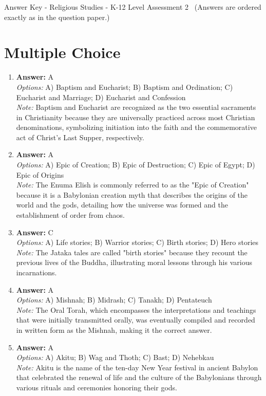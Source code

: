 \documentclass[12pt]{article}
\begin{document}
\begin{center}
Answer Key - Religious Studies - K-12 Level Assessment 2 \
\small (Answers are ordered exactly as in the question paper.)
\end{center}

\section*{Multiple Choice}
\begin{enumerate}[label=\arabic*.]
\item \textbf{Answer:} A
\\ \textit{Options:} A) Baptism and Eucharist; B) Baptism and Ordination; C) Eucharist and Marriage; D) Eucharist and Confession
\\ \textit{Note:} Baptism and Eucharist are recognized as the two essential sacraments in Christianity because they are universally practiced across most Christian denominations, symbolizing initiation into the faith and the commemorative act of Christ's Last Supper, respectively.
\item \textbf{Answer:} A
\\ \textit{Options:} A) Epic of Creation; B) Epic of Destruction; C) Epic of Egypt; D) Epic of Origins
\\ \textit{Note:} The Enuma Elish is commonly referred to as the "Epic of Creation" because it is a Babylonian creation myth that describes the origins of the world and the gods, detailing how the universe was formed and the establishment of order from chaos.
\item \textbf{Answer:} C
\\ \textit{Options:} A) Life stories; B) Warrior stories; C) Birth stories; D) Hero stories
\\ \textit{Note:} The Jataka tales are called "birth stories" because they recount the previous lives of the Buddha, illustrating moral lessons through his various incarnations.
\item \textbf{Answer:} A
\\ \textit{Options:} A) Mishnah; B) Midrash; C) Tanakh; D) Pentateuch
\\ \textit{Note:} The Oral Torah, which encompasses the interpretations and teachings that were initially transmitted orally, was eventually compiled and recorded in written form as the Mishnah, making it the correct answer.
\item \textbf{Answer:} A
\\ \textit{Options:} A) Akitu; B) Wag and Thoth; C) Bast; D) Nehebkau
\\ \textit{Note:} Akitu is the name of the ten-day New Year festival in ancient Babylon that celebrated the renewal of life and the culture of the Babylonians through various rituals and ceremonies honoring their gods.
\end{enumerate}
\end{document}
